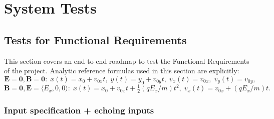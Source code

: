 \documentclass[12pt, titlepage]{article}
\providecommand{\wss}[1]{}
\begin{document}
\wss{You might want to use review sessions with the stakeholder to check that
the requirements document captures the right requirements.  Maybe task based
inspection?}

\wss{For those capstone teams with an external supervisor, the Rev 0 demo should 
be used as an opportunity to validate the requirements.  You should plan on 
demonstrating your project to your supervisor shortly after the scheduled Rev 0 demo.  
The feedback from your supervisor will be very useful for improving your project.}

\wss{For teams without an external supervisor, user testing can serve the same purpose 
as a Rev 0 demo for the supervisor.}

\wss{This section might reference back to the SRS verification section.}
\newpage
\section{System Tests}\label{Sec:SystemTests}

\wss{There should be text between all headings, even if it is just a roadmap of
the contents of the subsections.}

\subsection{Tests for Functional Requirements}

\wss{Subsets of the tests may be in related, so this section is divided into
  different areas.  If there are no identifiable subsets for the tests, this
  level of document structure can be removed.}
This section covers an end-to-end roadmap to test the Functional Requirements of the project.
Analytic reference formulas used in this section are explicitly:
\[
  \mathbf{E}=\mathbf{0},\mathbf{B}=\mathbf{0}:\;
  x(t)=x_0+v_{0x}t,\; y(t)=y_0+v_{0y}t,\;
  v_x(t)=v_{0x},\; v_y(t)=v_{0y},
\]
\[
  \mathbf{B}=\mathbf{0},\mathbf{E}=\langle E_x,0,0\rangle:\;
  x(t)=x_0+v_{0x}t+\tfrac{1}{2}(qE_x/m)t^2,\;
  v_x(t)=v_{0x}+(qE_x/m)t.
\]

\wss{Include a blurb here to explain why the subsections below
  cover the requirements.  References to the SRS would be good here.}

\subsubsection{Input specification + echoing inputs}
\end{document}
